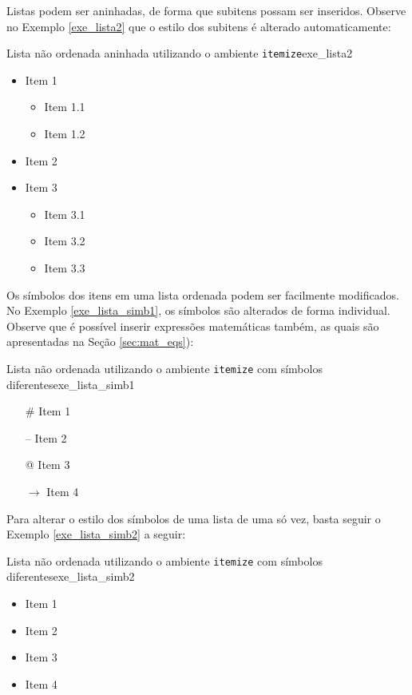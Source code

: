 Listas podem ser aninhadas, de forma que subitens possam ser inseridos. Observe no Exemplo \ref{exe_lista2} que o estilo dos subitens é alterado automaticamente:

\begin{texexptitled}[breakable,enhanced,middle=2mm]{Lista não ordenada aninhada utilizando o ambiente \texttt{itemize}}{exe_lista2}
\begin{itemize}
    \item Item 1
    \begin{itemize}
        \item Item 1.1
        \item Item 1.2
    \end{itemize}
    \item Item 2
    \item Item 3
    \begin{itemize}
        \item Item 3.1
        \item Item 3.2
        \item Item 3.3
    \end{itemize}
\end{itemize}
\end{texexptitled}

Os símbolos dos itens em uma lista ordenada podem ser facilmente modificados. No Exemplo \ref{exe_lista_simb1}, os símbolos são alterados de forma individual. Observe que é possível inserir expressões matemáticas também, as quais são apresentadas na Seção \ref{sec:mat_eqs}):

\begin{texexptitled}[breakable,enhanced,middle=2mm]{Lista não ordenada utilizando o ambiente \texttt{itemize} com símbolos diferentes}{exe_lista_simb1}
    \begin{itemize}
        \item[\#]    Item 1
        \item[--]    Item 2
        \item[@]     Item 3
        \item[$\to$] Item 4
    \end{itemize}
\end{texexptitled}

Para alterar o estilo dos símbolos de uma lista de uma só vez, basta seguir o Exemplo \ref{exe_lista_simb2} a seguir:

\begin{texexptitled}[breakable,enhanced,middle=2mm]{Lista não ordenada utilizando o ambiente \texttt{itemize} com símbolos diferentes}{exe_lista_simb2}
    \begin{itemize}[label=$\to$]
        \item Item 1
        \item Item 2
        \item Item 3
        \item Item 4
    \end{itemize}
\end{texexptitled}

